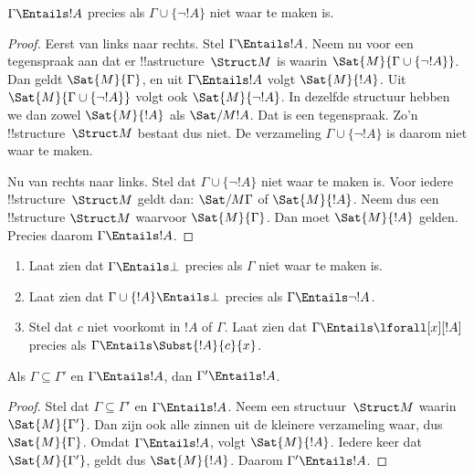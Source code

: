 \documentclass[openany]{memoir}
\begin{document}
\begin{prop}
$\Gamma \Entails !A$ precies als
$\Gamma \cup \{\lnot !A\}$ niet waar te maken is.
\end{prop}

\begin{proof}
Eerst van links naar rechts. Stel $\Gamma \Entails !A$. Neem nu voor
een tegenspraak aan dat er !!a{structure}~$\Struct M$ is waarin
$\Sat{M}{\Gamma \cup \{ \lnot !A \}}$. Dan geldt
$\Sat{M}{\Gamma}$, en uit $\Gamma \Entails !A$ volgt
$\Sat{M}{!A}$. Uit $\Sat{M}{\Gamma\cup \{ \lnot !A \}}$ volgt ook
$\Sat{M}{\lnot !A}$. In dezelfde structuur hebben we dan zowel
$\Sat{M}{!A}$ als $\Sat/{M}{!A}$. Dat is een tegenspraak. Zo'n
!!{structure}~$\Struct M$ bestaat dus niet. De verzameling
$\Gamma \cup \{ \lnot !A \}$ is daarom niet waar te maken.

Nu van rechts naar links. Stel dat
$\Gamma \cup \{ \lnot !A \}$ niet waar te maken is. Voor iedere
!!{structure}~$\Struct M$ geldt dan: $\Sat/{M}{\Gamma}$ of
$\Sat{M}{!A}$. Neem dus een !!{structure} $\Struct M$ waarvoor
$\Sat{M}{\Gamma}$. Dan moet $\Sat{M}{!A}$ gelden. Precies daarom
$\Gamma \Entails !A$.
\end{proof}

\begin{prob}
\begin{enumerate}
\item Laat zien dat $\Gamma \Entails \bot$ precies als $\Gamma$ niet
  waar te maken is.
\item Laat zien dat $\Gamma \cup \{!A\} \Entails \bot$ precies als
  $\Gamma \Entails \lnot !A$.
\item Stel dat $c$ niet voorkomt in $!A$ of $\Gamma$. Laat zien dat
  $\Gamma \Entails \lforall[x][!A]$ precies als $\Gamma \Entails
  \Subst{!A}{c}{x}$.
\end{enumerate}
\end{prob}

\begin{prop}
Als $\Gamma \subseteq \Gamma'$ en $\Gamma \Entails !A$, dan
$\Gamma' \Entails !A$.
\end{prop}

\begin{proof}
Stel dat $\Gamma \subseteq \Gamma'$ en $\Gamma \Entails !A$. Neem een
structuur~$\Struct M$ waarin $\Sat{M}{\Gamma'}$. Dan zijn ook alle
zinnen uit de kleinere verzameling waar, dus $\Sat{M}{\Gamma}$. Omdat
$\Gamma \Entails !A$, volgt $\Sat{M}{!A}$. Iedere keer dat
$\Sat{M}{\Gamma'}$, geldt dus $\Sat{M}{!A}$. Daarom
$\Gamma' \Entails !A$.
\end{proof}
\end{document}
